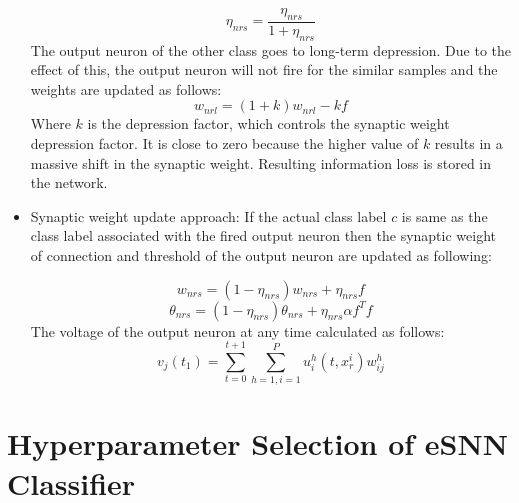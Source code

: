 \begin{itemize}
	\begin{equation}
		\eta_{nrs}=\frac{\eta_{nrs}}{1+\eta_{nrs}}
	\end{equation}
	The output neuron of the other class goes to long-term depression. Due to the effect of this, the output neuron will not fire for the similar samples and the weights are updated as follows:
	\begin{equation}
		w_{nrl}=(1+k)w_{nrl}-kf
	\end{equation}
	Where $k$ is the depression factor, which controls the synaptic weight depression factor. It is close to zero because the higher value of $k$ results in a massive shift in the synaptic weight. Resulting information loss is stored in the network.
	
	\item Synaptic weight update approach: If the actual class label $c$ is same as the class label associated with the fired output neuron then the synaptic weight of connection and threshold of the output neuron are updated as following:

	\begin{equation}
		w_{nrs}=(1-\eta_{nrs})w_{nrs}+\eta_{nrs}f
	\end{equation}
	\begin{equation}
		\theta_{nrs}=(1-\eta_{nrs})\theta_{nrs}+\eta_{nrs}\alpha f^T f
	\end{equation}
	The voltage of the output neuron at any time calculated as follows:
	\begin{equation}
		v_j(t_1)=\sum_{t=0}^{t+1}\sum_{h=1, i=1}^P u_i^h(t, x_r^i)w_{ij}^h
	\end{equation}
		
\end{itemize}

\section{Hyperparameter Selection of eSNN Classifier}

